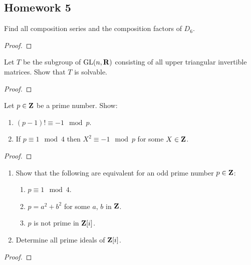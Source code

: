 \subsection{Homework 5}
\begin{problem}
  Find all composition series and the composition factors of $D_6$.
\end{problem}
\begin{proof}
\end{proof}

\begin{problem}
  Let $T$ be the subgroup of $\mathrm{GL}(n,\mathbf{R})$ consisting of all upper
  triangular invertible matrices. Show that $T$ is solvable.
\end{problem}
\begin{proof}
\end{proof}

\begin{problem}
  Let $p\in\mathbf{Z}$ be a prime number. Show:
  \begin{enumerate}[label=(\alph*)]
  \item $(p-1)!\equiv -1\mod{p}$.
  \item If $p\equiv 1\mod{4}$ then $X^2\equiv-1\mod{p}$ for some
    $X\in\mathbf{Z}$.
  \end{enumerate}
\end{problem}
\begin{proof}
\end{proof}

\begin{problem}
  \begin{enumerate}[label=(\alph*)]
  \item Show that the following are equivalent for an odd prime number
    $p\in\mathbf{Z}$:
    \begin{enumerate}[label=(\roman*)]
    \item $p\equiv 1\mod 4$.
    \item $p=a^2+b^2$ for some $a$, $b$ in $\mathbf{Z}$.
    \item $p$ is not prime in $\mathbf{Z}[i]$.
    \end{enumerate}
  \item Determine all prime ideals of $\mathbf{Z}[i]$.
  \end{enumerate}
\end{problem}
\begin{proof}
\end{proof}

